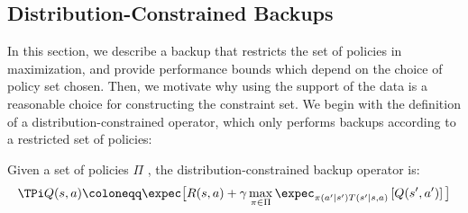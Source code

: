
\subsection{Distribution-Constrained Backups}
\label{sec:dist_constrained}
In this section, we describe a backup that restricts the set of policies in maximization, and provide performance bounds which depend on the choice of policy set chosen. Then, we motivate why using the support of the data is a reasonable choice for constructing the constraint set. We begin with the definition of a distribution-constrained operator, which only performs backups according to a restricted set of policies:
\begin{definition}
Given a set of policies $\Pi$ 
, the distribution-constrained backup operator is:
\[ \TPi Q(s, a) \coloneqq \expec \big[ R(s, a) + \gamma \max_{\pi \in \Pi} \expec_{\pi(a' | s')T(s' | s, a)}\left[Q(s', a') \right] \big] \]
\end{definition}

